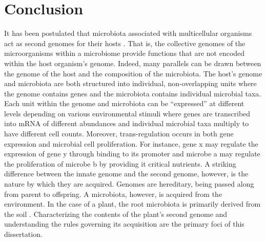 \chapter{Conclusion}
It has been postulated that microbiota associated with multicellular organisms act as second genomes for their hosts \cite{grice2012human}. That is, the collective genomes of the microorganisms within a microbiome provide functions that are not encoded within the host organism’s genome. Indeed, many parallels can be drawn between the genome of the host and the composition of the microbiota. The host’s genome and microbiota are both structured into individual, non-overlapping units where the genome contains genes and the microbiota contains individual microbial taxa. Each unit within the genome and microbiota can be “expressed” at different levels depending on various environmental stimuli where genes are transcribed into mRNA of different abundances and individual microbial taxa multiply to have different cell counts. Moreover, trans-regulation occurs in both gene expression and microbial cell pro{}liferation. For instance, gene x may regulate the expression of gene y through binding to its promoter and microbe a may regulate the proliferation of microbe b by providing it critical nutrients. A striking difference between the innate genome and the second genome, however, is the nature by which they are acquired. Genomes are hereditary, being passed along from parent to offspring. A microbiota, however, is acquired from the environment. In the case of a plant, the root microbiota is primarily derived from the soil \cite{Zarraonaindia2015}. Characterizing the contents of the plant’s second genome and understanding the rules governing its acquisition are the primary foci of this dissertation.

